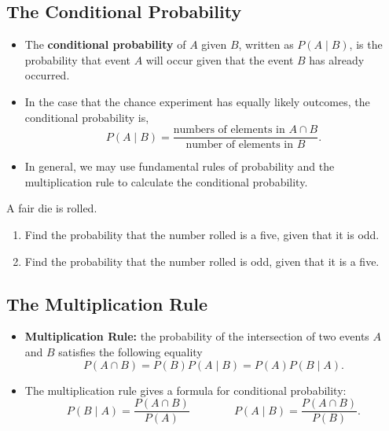 \hypertarget{the-conditional-probability}{%
\subsection{The Conditional
Probability}\label{the-conditional-probability}}

\begin{itemize}
\item
  The \textbf{conditional probability} of \(A\) given \(B\), written as
  \(P(A\mid B)\), is the probability that event \(A\) will occur given
  that the event \(B\) has already occurred.
\item
  In the case that the chance experiment has equally likely outcomes,
  the conditional probability is, \[
  P(A\mid B)=\dfrac{\text{numbers of elements in }A\cap B}{\text{number of elements in }B}.
  \]
\item
  In general, we may use fundamental rules of probability and the
  multiplication rule to calculate the conditional probability.
\end{itemize}

\begin{example}

A fair die is rolled.

\begin{enumerate}
  \item 
  Find the probability that the number rolled is a five, given that it is odd.
  \item
  Find the probability that the number rolled is odd, given that it is a five.
\end{enumerate}

\end{example}

\hypertarget{the-multiplication-rule}{%
\subsection{The Multiplication Rule}\label{the-multiplication-rule}}

\begin{itemize}
\item
  \textbf{Multiplication Rule:} the probability of the intersection of
  two events \(A\) and \(B\) satisfies the following equality \[
  P(A\cap B)=P(B)P(A\mid B)=P(A)P(B\mid A).
  \]
\item
  The multiplication rule gives a formula for conditional probability:
  \[
  P(B\mid A)=\dfrac{P(A\cap B)}{P(A)}\qquad\qquad P(A\mid B)=\dfrac{P(A\cap B)}{P(B)}.
  \]
\end{itemize}


